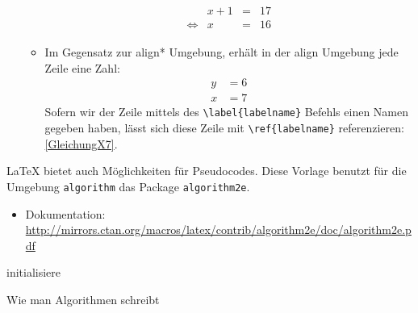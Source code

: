 \begin{enumerate}[a)]
\begin{itemize}
\begin{align*}
\begin{array}{lrcl}
            & x+1 &=& 17 \\
            \Longleftrightarrow & x &=& 16
        \end{array}
    \end{align*}
  \item
  Im Gegensatz zur align* Umgebung, erhält in der align Umgebung jede Zeile eine Zahl:
  \begin{align}
      y &= 6  \\
      x &= 7 \label{GleichungX7}
  \end{align}
  Sofern wir der Zeile mittels des \texttt{\textbackslash{}label\{labelname\}} Befehls einen Namen gegeben haben, lässt sich diese Zeile mit \texttt{\textbackslash{}ref\{labelname\}} referenzieren: \cref{GleichungX7}.
\end{itemize}
\end{enumerate}

LaTeX bietet auch Möglichkeiten für Pseudocodes. Diese Vorlage benutzt für die Umgebung \texttt{algorithm} das Package \texttt{algorithm2e}.
\begin{itemize}
\item Dokumentation: \url{http://mirrors.ctan.org/macros/latex/contrib/algorithm2e/doc/algorithm2e.pdf}
\end{itemize}

\begin{algorithm}[H]
\SetAlgoLined
\DontPrintSemicolon
{}
\BlankLine
initialisiere 
\caption{Wie man Algorithmen schreibt}
\end{algorithm}


